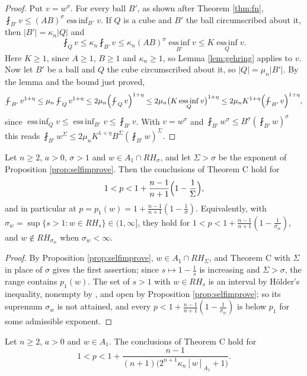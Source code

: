 \begin{proof}
Put $v=w^\sigma$. For every ball $B'$, as shown after Theorem \ref{thm:fn},
$\fint_{B'}v\le(AB)^\sigma\operatorname*{ess\,inf}_{B'}v$. If $Q$ is a cube and $B'$ the ball circumscribed
about it, then $|B'|=\kappa_n|Q|$ and
\[
\fint_Qv\le\kappa_n\fint_{B'}v\le\kappa_n(AB)^\sigma\operatorname*{ess\,inf}_{B'}v
\le K\operatorname*{ess\,inf}_Qv .
\]
Here $K\ge1$, since $A\ge1$, $B\ge1$ and $\kappa_n\ge1$, so Lemma \ref{lem:gehring} applies to $v$.
Now let $B'$ be a ball and $Q$ the cube circumscribed about it, so $|Q|=\mu_n|B'|$. By the lemma
and the bound just proved,
\[
\fint_{B'}v^{1+\eta}\le\mu_n\fint_Qv^{1+\eta}\le2\mu_n\Bigl(\fint_Qv\Bigr)^{1+\eta}
\le2\mu_n\bigl(K\operatorname*{ess\,inf}_Qv\bigr)^{1+\eta}\le2\mu_nK^{1+\eta}\Bigl(\fint_{B'}v\Bigr)^{1+\eta},
\]
since $\operatorname*{ess\,inf}_Qv\le\operatorname*{ess\,inf}_{B'}v\le\fint_{B'}v$. With $v=w^\sigma$ and
$\fint_{B'}w^\sigma\le B^\sigma(\fint_{B'}w)^\sigma$ this reads
$\fint_{B'}w^\Sigma\le2\mu_nK^{1+\eta}B^\Sigma(\fint_{B'}w)^\Sigma$.
\end{proof}

\begin{theorem}\label{thm:boundary}
Let $n\ge2$, $a>0$, $\sigma>1$ and $w\in A_1\cap RH_\sigma$, and let $\Sigma>\sigma$ be the exponent of
Proposition \ref{prop:selfimprove}. Then the conclusions of Theorem C hold for
\[
1<p<1+\frac{n-1}{n+1}\Bigl(1-\frac1\Sigma\Bigr),
\]
and in particular at $p=p_1(w)=1+\frac{n-1}{n+1}(1-\frac1\sigma)$. Equivalently, with
$\sigma_w=\sup\{s>1:w\in RH_s\}\in(1,\infty]$, they hold for
$1<p<1+\frac{n-1}{n+1}(1-\frac1{\sigma_w})$, and $w\notin RH_{\sigma_w}$ when $\sigma_w<\infty$.
\end{theorem}

\begin{proof}
By Proposition \ref{prop:selfimprove}, $w\in A_1\cap RH_\Sigma$, and Theorem C with $\Sigma$ in place
of $\sigma$ gives the first assertion; since $s\mapsto1-\frac1s$ is increasing and $\Sigma>\sigma$,
the range contains $p_1(w)$. The set of $s>1$ with $w\in RH_s$ is an interval by H\"older's
inequality, nonempty by \cite{CF74}, and open by Proposition \ref{prop:selfimprove}; so its
supremum $\sigma_w$ is not attained, and every $p<1+\frac{n-1}{n+1}(1-\frac1{\sigma_w})$ is below
$p_1$ for some admissible exponent.
\end{proof}

\begin{corollary}\label{cor:A1only}
Let $n\ge2$, $a>0$ and $w\in A_1$. The conclusions of Theorem C hold for
\[
1<p<1+\frac{n-1}{(n+1)\bigl(2^{n+1}\kappa_n[w]_{A_1}+1\bigr)} .
\]
\end{corollary}

